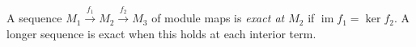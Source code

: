 
A sequence $M_1\xrightarrow{f_1}M_2\xrightarrow{f_2}M_3$ of module maps is \emph{exact at $M_2$} if $\operatorname{im}f_1=\ker f_2$. A longer sequence is exact when this holds at each interior term.
